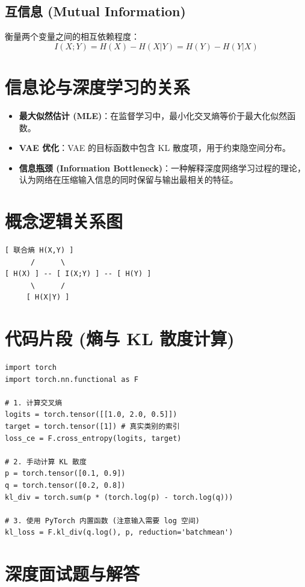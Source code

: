 \documentclass[12pt, a4paper]{article}
\begin{document}
\subsection{互信息 (Mutual Information)}
衡量两个变量之间的相互依赖程度：
$$ I(X; Y) = H(X) - H(X|Y) = H(Y) - H(Y|X) $$

\section{信息论与深度学习的关系}
\begin{itemize}
    \item \textbf{最大似然估计 (MLE)}：在监督学习中，最小化交叉熵等价于最大化似然函数。
    \item \textbf{VAE 优化}：VAE 的目标函数中包含 KL 散度项，用于约束隐空间分布。
    \item \textbf{信息瓶颈 (Information Bottleneck)}：一种解释深度网络学习过程的理论，认为网络在压缩输入信息的同时保留与输出最相关的特征。
\end{itemize}

\section{概念逻辑关系图}
\begin{verbatim}
[ 联合熵 H(X,Y) ]
      /      \
[ H(X) ] -- [ I(X;Y) ] -- [ H(Y) ]
      \      /
     [ H(X|Y) ]
\end{verbatim}

\section{代码片段 (熵与 KL 散度计算)}
\begin{lstlisting}
import torch
import torch.nn.functional as F

# 1. 计算交叉熵
logits = torch.tensor([[1.0, 2.0, 0.5]])
target = torch.tensor([1]) # 真实类别的索引
loss_ce = F.cross_entropy(logits, target)

# 2. 手动计算 KL 散度
p = torch.tensor([0.1, 0.9])
q = torch.tensor([0.2, 0.8])
kl_div = torch.sum(p * (torch.log(p) - torch.log(q)))

# 3. 使用 PyTorch 内置函数 (注意输入需要 log 空间)
kl_loss = F.kl_div(q.log(), p, reduction='batchmean')
\end{lstlisting}

\section{深度面试题与解答}
\end{document}
